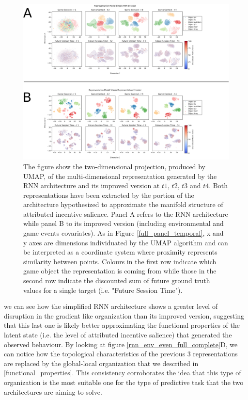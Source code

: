 \begin{figure}[ht]
\centering
\includegraphics[width=\textwidth]{images/chapter_4/rnn_predictive.png}
\caption[\textbf{Differences in predictive power between the representations generated by the RNN architecture and its improved version}]{The figure show the two-dimensional projection, produced by UMAP, of the multi-dimensional representation generated by the RNN architecture and its improved version at $t1$, $t2$, $t3$ and $t4$. Both representations have been extracted by the portion of the architecture hypothesized to approximate the manifold structure of attributed incentive salience. Panel A refers to the RNN architecture while panel B to its improved version (including environmental and game events covariates). As in Figure \ref{full_panel_temporal}, x and y axes are dimensions individuated by the UMAP algorithm and can be interpreted as a coordinate system where proximity represents similarity between points. Colours in the first row indicate which game object the representation is coming from while those in the second row indicate the discounted sum of future ground truth values for a single target (i.e. "Future Session Time").}
\label{rnn_predictive_comparison}
\end{figure}

we can see how the simplified RNN architecture shows a greater level of disruption in the gradient like organization than its improved version, suggesting that this last one is likely better approximating the functional properties of the latent state (i.e. the level of attributed incentive salience) that generated the observed behaviour. By looking at figure \ref{rnn_env_even_full_complete}D, we can notice how the topological characteristics of the previous 3 representations are replaced by the global-local organization that we described in \ref{functional_properties}. This consistency corroborates the idea that this type of organization is the most suitable one for the type of predictive task that the two architectures are aiming to solve.

